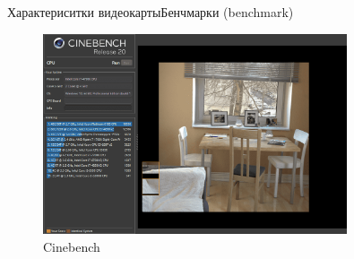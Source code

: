 \documentclass{beamer}
\begin{document}
\begin{frame}{Характериситки видеокарты}{Бенчмарки (benchmark)} 
	\begin{figure} 
		\includegraphics[width=0.8\textwidth]{images/Cinebench.png}
		\caption {Cinebench}
	\end{figure}
	
\end{frame}
\end{document}
